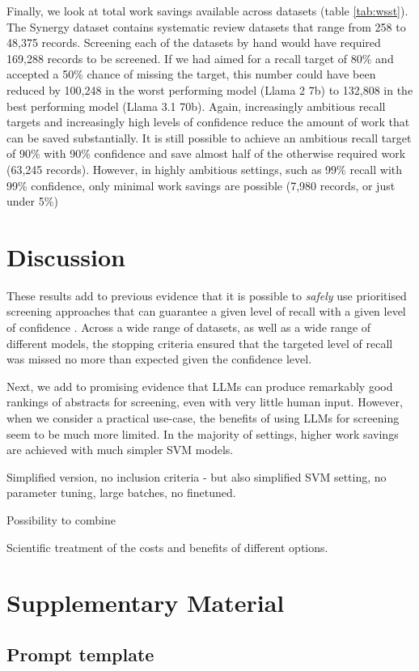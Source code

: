 \documentclass{article}
\begin{document}
	Finally, we look at total work savings available across datasets (table \ref{tab:wsst}). The Synergy dataset contains systematic review datasets that range from 258 to 48,375 records. 
	Screening each of the datasets by hand would have required 169,288 records to be screened.	
	If we had aimed for a recall target of 80\% and accepted a 50\% chance of missing the target, this number could have been reduced by 100,248 in the worst performing model (Llama 2 7b) to 132,808 in the best performing model (Llama 3.1 70b).
	Again, increasingly ambitious recall targets and increasingly high levels of confidence reduce the amount of work that can be saved substantially. It is still possible to achieve an ambitious recall target of 90\% with 90\% confidence and save almost half of the otherwise required work (63,245 records). However, in highly ambitious settings, such as 99\% recall with 99\% confidence, only minimal work savings are possible (7,980 records, or just under 5\%)

	
	\section*{Discussion}
	
	These results add to previous evidence that it is possible to \textit{safely} use prioritised screening approaches that can guarantee a given level of recall with a given level of confidence \cite{callaghan_statistical_2020}. Across a wide range of datasets, as well as a wide range of different models, the stopping criteria ensured that the targeted level of recall was missed no more than expected given the confidence level.
	
	Next, we add to promising evidence that LLMs can produce remarkably good rankings of abstracts for screening, even with very little human input. However, when we consider a practical use-case, the benefits of using LLMs for screening seem to be much more limited. In the majority of settings, higher work savings are achieved with much simpler SVM models.
	
	Simplified version, no inclusion criteria - but also simplified SVM setting, no parameter tuning, large batches, no finetuned.
	
	Possibility to combine
	
	Scientific treatment of the costs and benefits of different options. 
	
	
	
	
	
	
	
	\appendix
	
	\section*{Supplementary Material}
	
	\subsection*{Prompt template}
	
	
\end{document}
